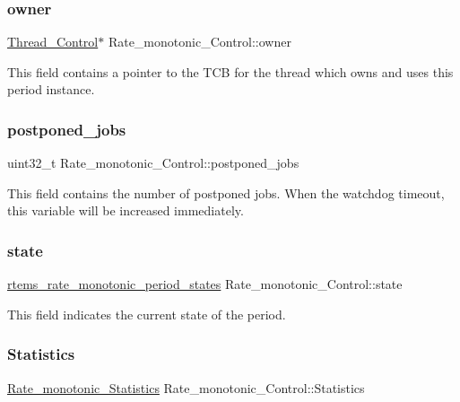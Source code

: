 \subsubsection{\texorpdfstring{owner}{owner}}
{\footnotesize\ttfamily \mbox{\hyperlink{struct__Thread__Control}{Thread\+\_\+\+Control}}$\ast$ Rate\+\_\+monotonic\+\_\+\+Control\+::owner}

This field contains a pointer to the T\+CB for the thread which owns and uses this period instance. \mbox{\label{structRate__monotonic__Control_a96732887b5cce6f60f55431666e46288}} 
\subsubsection{\texorpdfstring{postponed\_jobs}{postponed\_jobs}}
{\footnotesize\ttfamily uint32\+\_\+t Rate\+\_\+monotonic\+\_\+\+Control\+::postponed\+\_\+jobs}

This field contains the number of postponed jobs. When the watchdog timeout, this variable will be increased immediately. \mbox{\label{structRate__monotonic__Control_af28511a5363f94b4e136635e56c4d846}} 
\subsubsection{\texorpdfstring{state}{state}}
{\footnotesize\ttfamily \mbox{\hyperlink{group__ClassicRateMon_ga0fd6fa9e7304b022e004061d542ca743}{rtems\+\_\+rate\+\_\+monotonic\+\_\+period\+\_\+states}} Rate\+\_\+monotonic\+\_\+\+Control\+::state}

This field indicates the current state of the period. \mbox{\label{structRate__monotonic__Control_a4857637dc9ed13112fff9aaae0114ea0}} 
\subsubsection{\texorpdfstring{Statistics}{Statistics}}
{\footnotesize\ttfamily \mbox{\hyperlink{structRate__monotonic__Statistics}{Rate\+\_\+monotonic\+\_\+\+Statistics}} Rate\+\_\+monotonic\+\_\+\+Control\+::\+Statistics}

